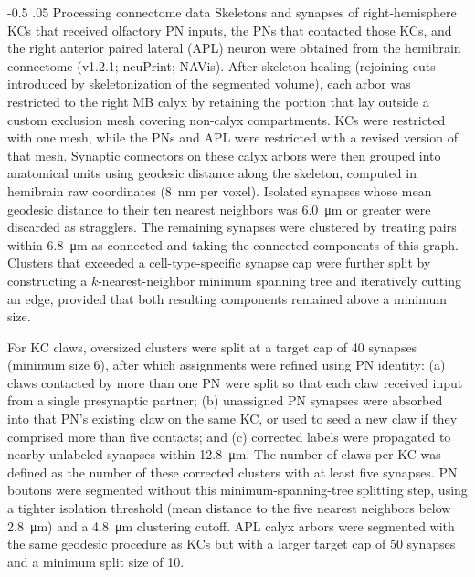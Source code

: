 \documentclass[12pt]{caltech_thesis}
\makeatletter
\let\Oldsubsubsection\subsubsection
\renewcommand{\subsubsection}{\FloatBarrier\Oldsubsubsection}
\renewcommand\subsubsection{%
    \@startsection{subsubsection}{4}{0mm}%
       {-0.5\baselineskip}%
       {.05\baselineskip}%
       {\normalfont\normalsize\bfseries\itshape}}
\makeatother
\begin{document}
\begin{refsection}
\subsubsection{Processing connectome data}
\label{sssec:connectome_weights}
Skeletons and synapses of right-hemisphere KCs that received olfactory PN inputs, the PNs that contacted those KCs, and the right anterior paired lateral (APL) neuron were obtained from the hemibrain connectome (v1.2.1; neuPrint; NAVis).
After skeleton healing (rejoining cuts introduced by skeletonization of the segmented volume), each arbor was restricted to the right MB calyx by retaining the portion that lay outside a custom exclusion mesh covering non-calyx compartments.
KCs were restricted with one mesh, while the PNs and APL were restricted with a revised version of that mesh.
Synaptic connectors on these calyx arbors were then grouped into anatomical units using geodesic distance along the skeleton, computed in hemibrain raw coordinates (\qty{8}{\nano\metre} per voxel).
Isolated synapses whose mean geodesic distance to their ten nearest neighbors was \qty{6.0}{\micro\metre} or greater were discarded as stragglers.
The remaining synapses were clustered by treating pairs within \qty{6.8}{\micro\metre} as connected and taking the connected components of this graph.
Clusters that exceeded a cell-type-specific synapse cap were further split by constructing a $k$-nearest-neighbor minimum spanning tree and iteratively cutting an edge, provided that both resulting components remained above a minimum size.

For KC claws, oversized clusters were split at a target cap of 40 synapses (minimum size 6), after which assignments were refined using PN identity: (a) claws contacted by more than one PN were split so that each claw received input from a single presynaptic partner; (b) unassigned PN synapses were absorbed into that PN's existing claw on the same KC, or used to seed a new claw if they comprised more than five contacts; and (c) corrected labels were propagated to nearby unlabeled synapses within \qty{12.8}{\micro\metre}.
The number of claws per KC was defined as the number of these corrected clusters with at least five synapses.
PN boutons were segmented without this minimum-spanning-tree splitting step, using a tighter isolation threshold (mean distance to the five nearest neighbors below \qty{2.8}{\micro\metre}) and a \qty{4.8}{\micro\metre} clustering cutoff.
APL calyx arbors were segmented with the same geodesic procedure as KCs but with a larger target cap of 50 synapses and a minimum split size of 10. 


\end{refsection}
\end{document}
